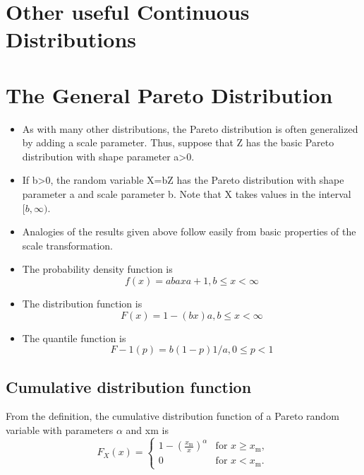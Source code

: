 \documentclass[]{report}
\begin{document}
\section{Other useful Continuous Distributions}







\section{The General Pareto Distribution}

\begin{itemize}
\item As with many other distributions, the Pareto distribution is often generalized by adding a scale parameter. Thus, suppose that Z has the basic Pareto distribution with shape parameter a>0.
\item If b>0, the random variable X=bZ has the Pareto distribution with shape parameter a and scale parameter b. Note that X takes values in the interval $[b, \infty)$.

\item Analogies of the results given above follow easily from basic properties of the scale transformation.

\end{itemize}



\begin{itemize}
\item The probability density function is
\[ f(x)=abaxa+1,b\leq x< \infty \]
\item The distribution function is
\[F(x)=1-(bx)a,b\leq x< \infty \]


\item The quantile function is
\[F-1(p)=b(1-p)1/a,0\leq p<1\]
\end{itemize}


\subsection{Cumulative distribution function}
From the definition, the cumulative distribution function of a Pareto random variable with parameters $\alpha$ and xm is
\[F_X(x) = \begin{cases}
1-\left(\frac{x_\mathrm{m}}{x}\right)^\alpha & \mbox{for } x \ge x_\mathrm{m}, \\
0 & \mbox{for }x < x_\mathrm{m}.
\end{cases}
\]
\end{document}
